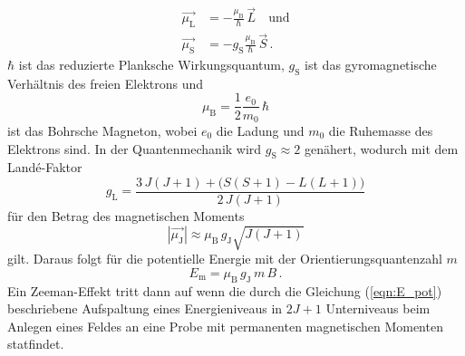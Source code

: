 \begin{align}
    \vec{\mu _{\text{L}}} &= - \frac{\mu_{\text{B}}}{\hbar}\,\vec{L}\quad\text{und} \label{eqn:magnetischerMommentDrehimpuls} \\
    \vec{\mu _ {\text{S}}} &= -g_{\text{S}}\frac{\mu_{\text{B}}}{\hbar}\,\vec{S}\,. \label{eqn:magnetischerMomentSpin}
\end{align}
$\hbar$ ist das reduzierte Planksche Wirkungsquantum, $g_{\text{S}}$ ist das gyromagnetische Verhältnis des freien Elektrons und 
\begin{equation}
    \mu _{\text{B}} = \frac{1}{2} \frac{e_0}{m_0}\,\hbar
    \label{eqn:BohrscheMagneton}
\end{equation}
ist das Bohrsche Magneton, wobei $e_0$ die Ladung und $m_0$ die Ruhemasse des Elektrons sind. 
In der Quantenmechanik wird $g_{\text{S}} \approx 2$ genähert, wodurch mit dem Landé-Faktor
\begin{equation}
    g_{\text{L}} = \frac{3\,J \left(J+1\right) + \big(S\left(S +1\right) -L\left(L+1\right)\big)}{2\,J\left(J+1\right)} 
    \label{eqn:LandeFaktor}
\end{equation}
für den Betrag des magnetischen Moments 
\begin{equation}
    \left|\vec{\mu_{\text{J}}}\right| \approx \mu_{\text{B}}\,g_{\text{J}}\sqrt{J\left(J+1\right)}
    \label{eqn:magnetischerMoment}
\end{equation}
gilt. Daraus folgt für die potentielle Energie mit der Orientierungsquantenzahl $m$
\begin{equation}
    E_{\text{m}} = \mu_{\text{B}}\,g_{\text{J}}\, m\, B\,. 
    \label{eqn:E_pot}
\end{equation}
Ein Zeeman-Effekt tritt dann auf wenn die durch die Gleichung (\ref{eqn:E_pot}) beschriebene Aufspaltung eines Energieniveaus
in $2J+1$ Unterniveaus beim Anlegen eines Feldes an eine Probe mit permanenten magnetischen Momenten statfindet.
